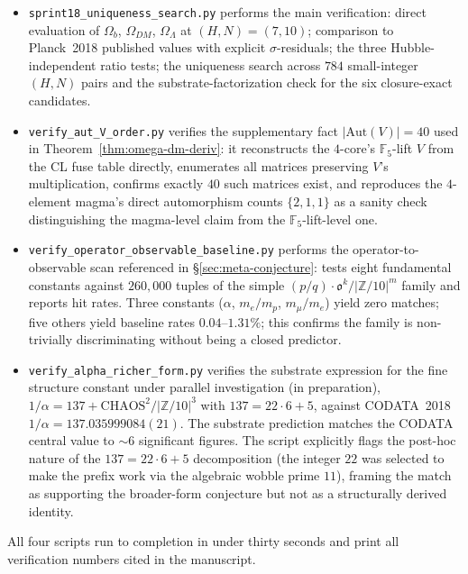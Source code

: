 \documentclass[11pt,reqno]{amsart}
\theoremstyle{plain}
\theoremstyle{definition}
\theoremstyle{remark}
\newcommand{\Z}{\mathbb{Z}}
\newcommand{\F}{\mathbb{F}}
\newcommand{\Aut}{\mathrm{Aut}}
\begin{document}
\begin{itemize}\setlength\itemsep{0pt}
\item \texttt{sprint18\_uniqueness\_search.py} performs the main
verification: direct evaluation of $\Omega_b$, $\Omega_{DM}$,
$\Omega_\Lambda$ at $(H, N) = (7, 10)$; comparison to Planck~2018
published values with explicit $\sigma$-residuals; the three
Hubble-independent ratio tests; the uniqueness search across $784$
small-integer $(H, N)$ pairs and the substrate-factorization check
for the six closure-exact candidates.

\item \texttt{verify\_aut\_V\_order.py} verifies the supplementary
fact $|\Aut(V)| = 40$ used in
Theorem~\ref{thm:omega-dm-deriv}: it reconstructs the $4$-core's
$\F_5$-lift $V$ from the CL fuse table directly, enumerates
all matrices preserving $V$'s multiplication, confirms exactly
$40$ such matrices exist, and reproduces the $4$-element magma's
direct automorphism counts $\{2, 1, 1\}$ as a sanity check
distinguishing the magma-level claim from the $\F_5$-lift-level
one.

\item \texttt{verify\_operator\_observable\_baseline.py}
performs the operator-to-observable scan referenced in
\S\ref{sec:meta-conjecture}: tests eight fundamental constants
against $260{,}000$ tuples of the simple
$(p/q) \cdot \mathfrak{o}^{k}/|\Z/10|^{m}$ family and reports
hit rates. Three constants ($\alpha$, $m_e/m_p$, $m_\mu/m_e$)
yield zero matches; five others yield baseline rates
$0.04$--$1.31\%$; this confirms the family is non-trivially
discriminating without being a closed predictor.

\item \texttt{verify\_alpha\_richer\_form.py}
verifies the substrate expression for the fine structure constant
under parallel investigation (in preparation),
$1/\alpha = 137 + \mathrm{CHAOS}^{2}/|\Z/10|^{3}$ with
$137 = 22 \cdot 6 + 5$, against CODATA~2018
$1/\alpha = 137.035999084(21)$. The substrate prediction matches
the CODATA central value to $\sim 6$ significant figures. The
script explicitly flags the post-hoc nature of the
$137 = 22 \cdot 6 + 5$ decomposition (the integer $22$ was
selected to make the prefix work via the algebraic wobble
prime $11$), framing the match as supporting the broader-form
conjecture but not as a structurally derived identity.
\end{itemize}

All four scripts run to completion in under thirty seconds and
print all verification numbers cited in the manuscript.
\end{document}
